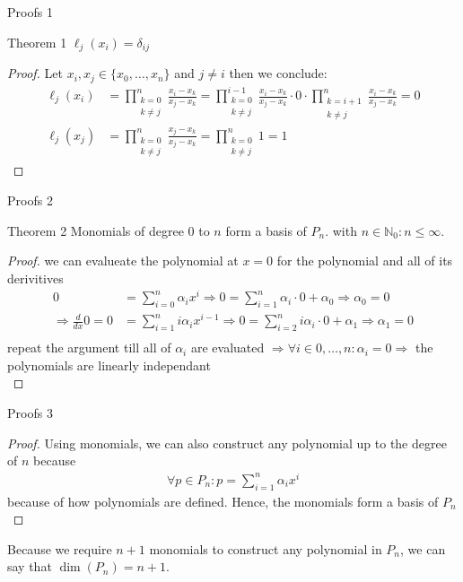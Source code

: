 \documentclass[8pt]{beamer}
\begin{document}
	\begin{frame}{Proofs 1}
		\begin{block}{Theorem 1}
			$\ell_j(x_i) = \delta_{ij}$
		\end{block}
		\begin{proof}
			Let $x_i, x_j \in \{x_0, \ldots, x_n \}$ and $j \neq i$ then we conclude: 
			\begin{align*}
				\ell_j(x_i) &= \prod_{\substack{k= 0 \\ k \neq j }}^{n}\frac{x_i - x_k}{x_j - x_k} = \prod_{\substack{k= 0 \\ k \neq j}}^{i-1}\frac{x_i - x_k}{x_j - x_k} \cdot 0 \cdot \prod_{\substack{k= i+1 \\ k \neq j}}^{n}\frac{x_i - x_k}{x_j - x_k} = 0 \\
				\ell_j(x_j) &= \prod_{\substack{k= 0 \\ k \neq j }}^{n}\frac{x_j - x_k}{x_j - x_k} =  \prod_{\substack{k= 0 \\ k \neq j }}^{n} 1 = 1
			\end{align*}
		\end{proof}
	\end{frame}
			
	\begin{frame}{Proofs 2}
		\begin{block}{Theorem 2}
			Monomials of degree $0$ to $n$ form a basis of $P_n$. with $n \in \mathbb{N}_0: n\leq \infty$.
		\end{block}
		\begin{proof}
 			we can evalueate the polynomial at $x = 0$ for the polynomial and all of its derivitives
			\begin{align*}
				0 &= \sum_{i=0}^{n}\alpha_i x^i \Rightarrow 0  =\sum_{i=1}^{n}\alpha_i \cdot 0 + \alpha_0 \Rightarrow \alpha_0 = 0\\
				\Rightarrow \frac{d}{dx} 0 = 0 &=\sum_{i=1}^{n}i\alpha_i x^{i-1} \Rightarrow 0  =\sum_{i=2}^{n}i\alpha_i \cdot 0 + \alpha_1 \Rightarrow \alpha_1 = 0\\
			\end{align*}
			repeat the argument till all of $\alpha_i$ are evaluated $\Rightarrow \forall i \in 0, \ldots, n: \alpha_i = 0\Rightarrow$ the polynomials are linearly independant\\
		\end{proof}

		\end{frame}
			
		\begin{frame}{Proofs 3}
			\begin{proof}
				Using monomials, we can also construct any polynomial up to the degree of $n$ because
				\begin{align*}
					\forall p \in P_n : p = \sum_{i=1}^{n}\alpha_i x^i 
				\end{align*}
				because of how polynomials are defined. Hence, the monomials form a basis of $P_n$\\
			\end{proof}
			Because we require $n+1$ monomials to construct any polynomial in $P_n$, we can say that $\dim(P_n) = n+1$.
			
		\end{frame}
							
\end{document}
